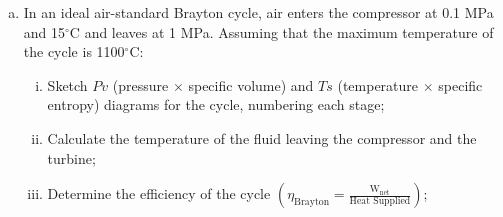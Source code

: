\documentclass[calculator,steamtables,refrigeranttables,psychrometricchart,datasheet,solutions]{exam}
\newcommand{\frc}{\displaystyle\frac}
\begin{document}
\begin{question}
\begin{enumerate}[(a)]
\item In an ideal air-standard Brayton cycle, air enters the compressor at 0.1 MPa and 15$^{\circ}$C and leaves at 1 MPa. Assuming that the maximum temperature of the cycle is 1100$^{\circ}$C:
\begin{enumerate}[(i)]
\item Sketch $Pv$ (pressure $\times$ specific volume) and $Ts$ (temperature $\times$ specific entropy) diagrams for the cycle, numbering each stage;~
%
\item Calculate the temperature of the fluid leaving the compressor and the turbine;~
%
\item Determine the efficiency of the cycle $\left(\eta_{\text{Brayton}}=\frc{\text{W}_{\text{net}}}{\text{Heat Supplied}}\right)$;~

\end{enumerate}
\end{enumerate}
\end{question}
\end{document}
